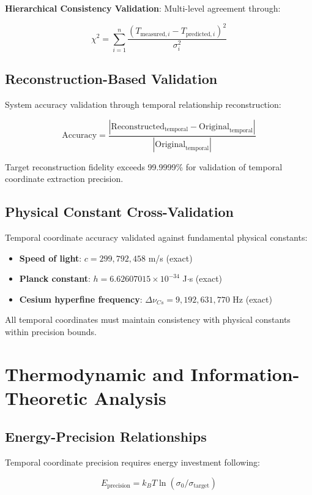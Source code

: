 \documentclass[11pt]{article}
\theoremstyle{remark}
\begin{document}
\textbf{Hierarchical Consistency Validation}: Multi-level agreement through:

$$\chi^2 = \sum_{i=1}^{n} \frac{(T_{\text{measured},i} - T_{\text{predicted},i})^2}{\sigma_i^2}$$

\subsection{Reconstruction-Based Validation}

System accuracy validation through temporal relationship reconstruction:

$$\text{Accuracy} = \frac{|\text{Reconstructed}_{\text{temporal}} - \text{Original}_{\text{temporal}}|}{|\text{Original}_{\text{temporal}}|}$$

Target reconstruction fidelity exceeds 99.9999\% for validation of temporal coordinate extraction precision.

\subsection{Physical Constant Cross-Validation}

Temporal coordinate accuracy validated against fundamental physical constants:

\begin{itemize}
\item \textbf{Speed of light}: $c = 299,792,458$ m/s (exact)
\item \textbf{Planck constant}: $h = 6.62607015 \times 10^{-34}$ J$\cdot$s (exact)
\item \textbf{Cesium hyperfine frequency}: $\Delta \nu_{Cs} = 9,192,631,770$ Hz (exact)
\end{itemize}

All temporal coordinates must maintain consistency with physical constants within precision bounds.

\section{Thermodynamic and Information-Theoretic Analysis}

\subsection{Energy-Precision Relationships}

Temporal coordinate precision requires energy investment following:

$$E_{\text{precision}} = k_B T \ln(\sigma_0/\sigma_{\text{target}})$$
\end{document}
